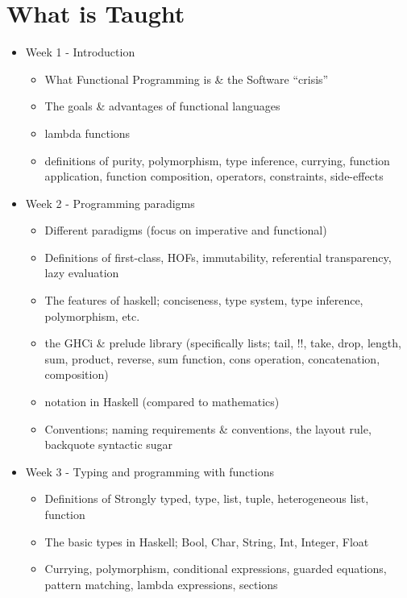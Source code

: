 \documentclass[tikz,border=10pt]{project_plan}
\begin{document}
\chapter*{What is Taught}

\begin{itemize}
  \item Week 1 - Introduction
        \begin{itemize}
          \item What Functional Programming is \& the Software “crisis”
          \item The goals \& advantages of functional languages
          \item lambda functions
          \item definitions of purity, polymorphism, type inference, currying,
                function application, function composition, operators, constraints, side-effects
        \end{itemize}
  \item Week 2 - Programming paradigms
        \begin{itemize}
          \item Different paradigms (focus on imperative and functional)
          \item Definitions of first-class, HOFs, immutability, referential
                transparency, lazy evaluation
          \item The features of haskell; conciseness, type system, type inference, polymorphism, etc.
          \item the GHCi \& prelude library (specifically lists; tail, !!, take, drop, length, sum, product, reverse, sum function, cons operation, concatenation, composition)
          \item notation in Haskell (compared to mathematics)
          \item Conventions; naming requirements \& conventions, the layout rule, backquote syntactic sugar
        \end{itemize}
  \item Week 3 - Typing and programming with functions
        \begin{itemize}
          \item Definitions of Strongly typed, type, list, tuple, heterogeneous list, function
          \item The basic types in Haskell; Bool, Char, String, Int, Integer, Float
          \item Currying, polymorphism, conditional expressions, guarded equations, pattern matching, lambda expressions, sections

\end{itemize}
\end{itemize}
\end{document}
